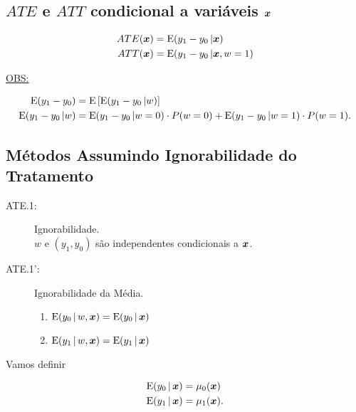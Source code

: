\documentclass[11pt, oneside, a4paper, article]{article}
\numberwithin{equation}{section}
\begin{document}
\begin{description}
\begin{description}
\subsection*{$ATE$ e $ATT$ condicional a variáveis $\boldsymbol{x}$ }

\vspace{-1 em}
\begin{align*}
ATE( \boldsymbol{x} ) &= \text{E}( y_1 - y_0 \, | \boldsymbol{x})
\\
ATT( \boldsymbol{x} ) &= \text{E}( y_1 - y_0 \, | \boldsymbol{x}, w = 1)
\end{align*}

\noindent
\underline{OBS:}

\vspace{-1 em}
\begin{align*}
\text{E}( y_1 - y_0 ) &= \text{E} \left[ \text{E}( y_1 - y_0 \, | w) \right]
\\
\text{E}( y_1 - y_0 \, | w ) &=
\text{E}( y_1 - y_0 \, | w = 0 ) \cdot P(w=0)
+
\text{E}( y_1 - y_0 \, | w = 1 ) \cdot P(w=1).
\end{align*}

\subsection*{Métodos Assumindo Ignorabilidade do Tratamento}

\begin{description}
\item[ATE.1:] Ignorabilidade. 
\\
$w$ e $(y_{1}, y_{0})$ são independentes condicionais a $\boldsymbol{x}$.

\item[ATE.1':] Ignorabilidade da Média. 

\vspace{-.75 em}
\begin{enumerate}[label =\alph*)] \itemsep0pt
\item $\text{E}( y_{0} \, | \, w, \boldsymbol{x} ) = \text{E}( y_{0} \, | \, \boldsymbol{x} )$
\item $\text{E}( y_{1} \, | \, w, \boldsymbol{x} ) = \text{E}( y_{1} \, | \, \boldsymbol{x} )$
\end{enumerate}

\end{description}

Vamos definir

\vspace{-1 em}
\begin{align*}
\text{E}( y_{0} \, | \, \boldsymbol{x} ) &= \mu_{0}( \boldsymbol{x} )
\\
\text{E}( y_{1} \, | \, \boldsymbol{x} ) &= \mu_{1}( \boldsymbol{x} ).
\end{align*}


\end{description}
\end{description}
\end{document}
